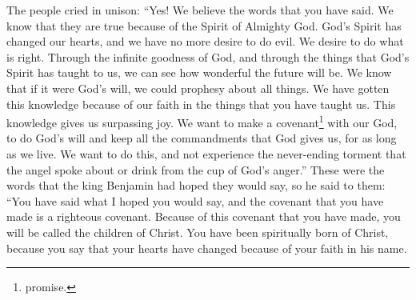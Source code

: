 The people cried in unison: ``Yes! We believe the words that you have said. We know that they are true because of the Spirit of Almighty God. God's Spirit has changed our hearts, and we have no more desire to do evil. We desire to do what is right.
\bverse \iffalse And we, ourselves, also, through the infinite goodness of God, and the manifestations of his Spirit, have great views of that which is to come; and were it expedient, we could prophesy of all things. \fi
Through the infinite goodness of God, and through the things that God's Spirit has taught to us, we can see how wonderful the future will be. We know that if it were God's will, we could prophesy about all things.
\bverse \iffalse And it is the faith which we have had on the things which our king has spoken unto us that has brought us to this great knowledge, whereby we do rejoice with such exceedingly great joy. \fi
We have gotten this knowledge because of our faith in the things that you have taught us. This knowledge gives us surpassing joy.
\bverse \iffalse And we are willing to enter into a covenant with our God to do his will, and to be obedient to his commandments in all things that he shall command us, all the remainder of our days, that we may not bring upon ourselves a never-ending torment, as has been spoken by the angel, that we may not drink out of the cup of the wrath of God. \fi
We want to make a covenant\footnote{promise.} with our God, to do God's will and keep all the commandments that God gives us, for as long as we live. We want to do this, and not experience the never-ending torment that the angel spoke about or drink from the cup of God's anger.''
\bverse \iffalse And now, these are the words which king Benjamin desired of them; and therefore he said unto them: Ye have spoken the words that I desired; and the covenant which ye have made is a righteous covenant. \fi
These were the words that the king Benjamin had hoped they would say, so he said to them: ``You have said what I hoped you would say, and the covenant that you have made is a righteous covenant.
\bverse \iffalse And now, because of the covenant which ye have made ye shall be called the children of Christ, his sons, and his daughters; for behold, this day he hath spiritually begotten you; for ye say that your hearts are changed through faith on his name; therefore, ye are born of him and have become his sons and his daughters. \fi
Because of this covenant that you have made, you will be called the children of Christ. You have been spiritually born of Christ, because you say that your hearts have changed because of your faith in his name. 
